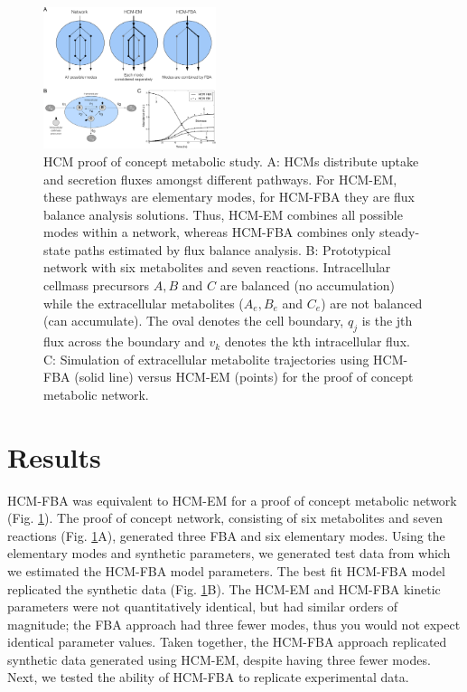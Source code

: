 \documentclass[10pt,twocolumn,twoside,final]{IEEEtran}
\begin{document}

\begin{figure}[!t]\centering
\includegraphics[width=0.45\textwidth]{./figs/Fig-1-Method-General.pdf}
\caption{HCM proof of concept metabolic study.
A: HCMs distribute uptake and secretion fluxes amongst different pathways. For HCM-EM, these pathways are elementary modes, for HCM-FBA they are flux balance analysis solutions.
Thus, HCM-EM combines all possible modes within a network, whereas HCM-FBA combines only steady-state paths estimated by flux balance analysis.
B: Prototypical network with six metabolites and seven reactions.
Intracellular cellmass precursors $A,B$ and $C$ are balanced (no accumulation) while the extracellular metabolites ($A_{e},B_{e}$ and $C_{e}$) are not balanced (can accumulate).
The oval denotes the cell boundary, $q_{j}$ is the jth flux across the boundary and $v_{k}$ denotes the kth intracellular flux.
C: Simulation of extracellular metabolite trajectories using HCM-FBA (solid line) versus HCM-EM (points) for the proof of concept metabolic network.
}\label{fig:model-fitting}
\end{figure}

\section{Results}
HCM-FBA was equivalent to HCM-EM for a proof of concept metabolic network (Fig. \ref{fig:model-fitting}).
The proof of concept network, consisting of six metabolites and seven reactions (Fig. \ref{fig:model-fitting}A), generated three FBA and six elementary modes.
Using the elementary modes and synthetic parameters, we generated test data from which we estimated the HCM-FBA model parameters.
The best fit HCM-FBA model replicated the synthetic data (Fig. \ref {fig:model-fitting}B).
The HCM-EM and HCM-FBA kinetic parameters were not quantitatively identical, but had similar orders of magnitude;
the FBA approach had three fewer modes, thus you would not expect identical parameter values.
Taken together, the HCM-FBA approach replicated synthetic data generated using HCM-EM, despite having three fewer modes.
Next, we tested the ability of HCM-FBA to replicate experimental data.
\end{document}
